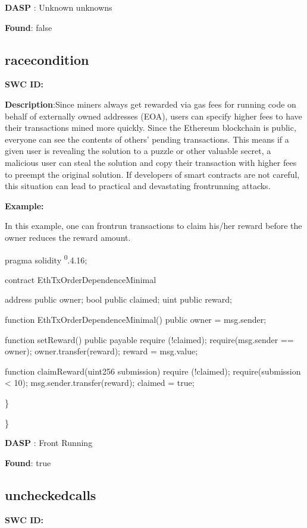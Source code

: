 \documentclass{article}
\begin{document}
\textbf{DASP} : Unknown unknowns

\textbf{Found}: false

\subsection{race\textunderscore condition} 
\textbf{SWC \textunderscore ID:} 

\textbf{Description}:Since miners always get rewarded via gas fees for running code on behalf of externally owned addresses (EOA), users can specify higher fees to have their transactions mined more quickly. Since the Ethereum blockchain is public, everyone can see the contents of others' pending transactions. This means if a given user is revealing the solution to a puzzle or other valuable secret, a malicious user can steal the solution and copy their transaction with higher fees to preempt the original solution. If developers of smart contracts are not careful, this situation can lead to practical and devastating front\textendash running attacks.


\textbf{Example:} 

In this example, one can front\textendash run transactions to claim his/her reward before the owner reduces the reward amount.

pragma solidity \textsuperscript0.4.16;

contract EthTxOrderDependenceMinimal {
    address public owner;
    bool public claimed;
    uint public reward;

    function EthTxOrderDependenceMinimal() public {
        owner = msg.sender;
    }

    function setReward() public payable {
        require (!claimed);
        require(msg.sender == owner);
        owner.transfer(reward);
        reward = msg.value;
    }

    function claimReward(uint256 submission) {
        require (!claimed);
        require(submission < 10);
        msg.sender.transfer(reward);
        claimed = true;
    }
}

\} 

\} 

\textbf{DASP} : Front Running

\textbf{Found}: true

\subsection{unchecked\textunderscore calls} 
\textbf{SWC \textunderscore ID:} 
\end{document}
